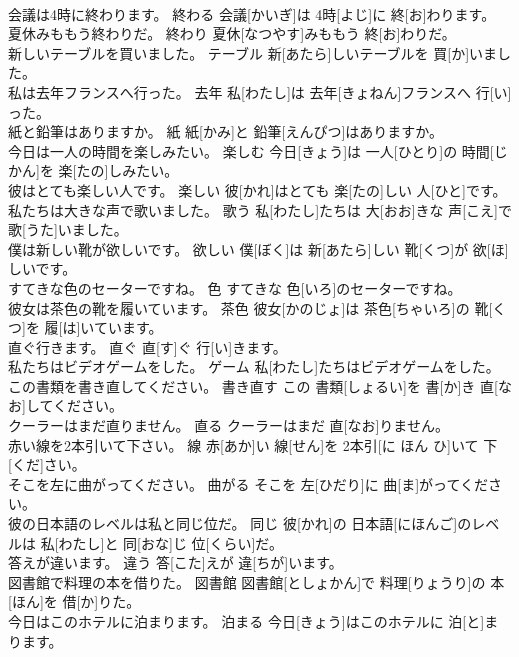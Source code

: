 \documentclass[8pt]{extreport}
\begin{document}
\begin{CJK}{UTF8}{min}
\\	会議は4時に終わります。	終わる	会議[かいぎ]は 4時[よじ]に 終[お]わります。	
\\	夏休みももう終わりだ。	終わり	夏休[なつやす]みももう 終[お]わりだ。	
\\	新しいテーブルを買いました。	テーブル	新[あたら]しいテーブルを 買[か]いました。	
\\	私は去年フランスへ行った。	去年	私[わたし]は 去年[きょねん]フランスへ 行[い]った。	
\\	紙と鉛筆はありますか。	紙	紙[かみ]と 鉛筆[えんぴつ]はありますか。	
\\	今日は一人の時間を楽しみたい。	楽しむ	今日[きょう]は 一人[ひとり]の 時間[じかん]を 楽[たの]しみたい。	
\\	彼はとても楽しい人です。	楽しい	彼[かれ]はとても 楽[たの]しい 人[ひと]です。	
\\	私たちは大きな声で歌いました。	歌う	私[わたし]たちは 大[おお]きな 声[こえ]で 歌[うた]いました。	
\\	僕は新しい靴が欲しいです。	欲しい	僕[ぼく]は 新[あたら]しい 靴[くつ]が 欲[ほ]しいです。	
\\	すてきな色のセーターですね。	色	すてきな 色[いろ]のセーターですね。	
\\	彼女は茶色の靴を履いています。	茶色	彼女[かのじょ]は 茶色[ちゃいろ]の 靴[くつ]を 履[は]いています。	
\\	直ぐ行きます。	直ぐ	直[す]ぐ 行[い]きます。	
\\	私たちはビデオゲームをした。	ゲーム	私[わたし]たちはビデオゲームをした。	
\\	この書類を書き直してください。	書き直す	この 書類[しょるい]を 書[か]き 直[なお]してください。	
\\	クーラーはまだ直りません。	直る	クーラーはまだ 直[なお]りません。	
\\	赤い線を2本引いて下さい。	線	赤[あか]い 線[せん]を 2本引[に ほん ひ]いて 下[くだ]さい。	
\\	そこを左に曲がってください。	曲がる	そこを 左[ひだり]に 曲[ま]がってください。	
\\	彼の日本語のレベルは私と同じ位だ。	同じ	彼[かれ]の 日本語[にほんご]のレベルは 私[わたし]と 同[おな]じ 位[くらい]だ。	
\\	答えが違います。	違う	答[こた]えが 違[ちが]います。	
\\	図書館で料理の本を借りた。	図書館	図書館[としょかん]で 料理[りょうり]の 本[ほん]を 借[か]りた。	
\\	今日はこのホテルに泊まります。	泊まる	今日[きょう]はこのホテルに 泊[と]まります。	

\end{CJK}
\end{document}
